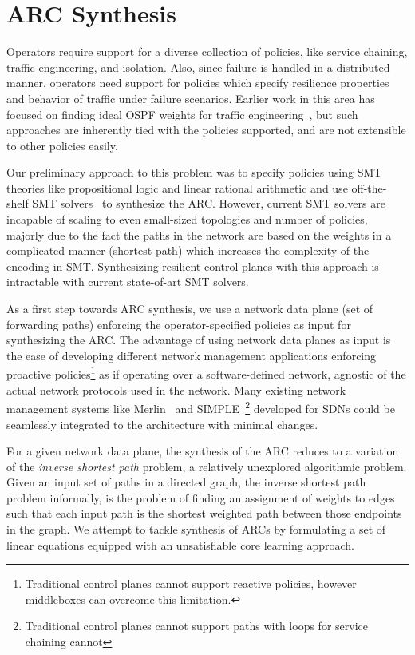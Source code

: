 \section{ARC Synthesis}
Operators require support for a diverse collection of policies, 
like service chaining, traffic engineering, and isolation. Also,
since failure is handled in a distributed manner, operators need 
support for policies which specify resilience properties and behavior
of traffic under failure scenarios. 
Earlier 
work in this area has focused on finding ideal OSPF weights for 
traffic engineering~\cite{te-ospf}, but such approaches are 
inherently tied with the policies supported, and are not extensible 
to other policies easily. 

Our preliminary approach to this problem was
to specify policies using SMT theories like propositional logic and 
linear rational arithmetic and use off-the-shelf SMT solvers~\cite{z3} 
to synthesize the ARC. However, current SMT solvers are incapable of 
scaling to even small-sized topologies and number of policies, majorly
due to the fact the paths in the network are based on the weights in a 
complicated manner (shortest-path) which increases the complexity of the
encoding in SMT. Synthesizing resilient control planes with this 
approach is intractable with current state-of-art SMT solvers.

As a first step towards ARC synthesis, 
we use a network data plane (set of forwarding paths)
enforcing the operator-specified policies 
as input for synthesizing the ARC. The  
advantage of using network data planes as 
input is the ease of developing
different network management applications 
enforcing proactive policies\footnote{
Traditional control planes cannot support reactive policies, however
middleboxes can overcome this limitation.} 
as if operating over a software-defined
network, agnostic of the actual network protocols used in the network. 
Many existing network management systems like Merlin~\cite{merlin} 
and SIMPLE~\cite{simple}\footnote{
Traditional control planes cannot support 
paths with loops for service chaining cannot} developed for SDNs could be seamlessly
integrated to the architecture with minimal changes.  

For a given network data plane, the synthesis of the ARC reduces to a
variation of the {\em inverse shortest path} problem, a relatively 
unexplored algorithmic problem. 
Given an input set of paths in a directed graph, the inverse shortest path problem 
informally, is the problem of finding an assignment of weights to edges 
such that each input path is the shortest weighted path between those endpoints in 
the graph. We attempt to tackle synthesis of ARCs by formulating a set of linear
equations  equipped with an unsatisfiable core learning approach. 

